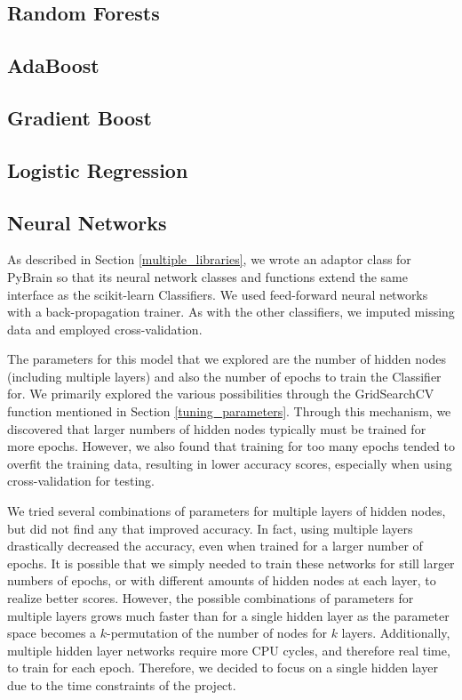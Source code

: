 \documentclass{article}
\begin{document}
 
\subsection{Random Forests}

\subsection{AdaBoost}

\subsection{Gradient Boost}

\subsection{Logistic Regression}

\subsection{Neural Networks}

As described in Section \ref{multiple_libraries}, we wrote an adaptor class for PyBrain so that its neural network classes and functions extend the same interface as the scikit-learn Classifiers.
We used feed-forward neural networks with a back-propagation trainer.
As with the other classifiers, we imputed missing data and employed cross-validation.

The parameters for this model that we explored are the number of hidden nodes (including multiple layers) and also the number of epochs to train the Classifier for.
We primarily explored the various possibilities through the GridSearchCV function mentioned in Section \ref{tuning_parameters}.
Through this mechanism, we discovered that larger numbers of hidden nodes typically must be trained for more epochs.
However, we also found that training for too many epochs tended to overfit the training data, resulting in lower accuracy scores, especially when using cross-validation for testing.

We tried several combinations of parameters for multiple layers of hidden nodes, but did not find any that improved accuracy.
In fact, using multiple layers drastically decreased the accuracy, even when trained for a larger number of epochs.
It is possible that we simply needed to train these networks for still larger numbers of epochs, or with different amounts of hidden nodes at each layer, to realize better scores.
However, the possible combinations of parameters for multiple layers grows much faster than for a single hidden layer as the parameter space becomes a $k$-permutation of the number of nodes for $k$ layers.
Additionally, multiple hidden layer networks require more CPU cycles, and therefore real time, to train for each epoch.
Therefore, we decided to focus on a single hidden layer due to the time constraints of the project.
\end{document}
